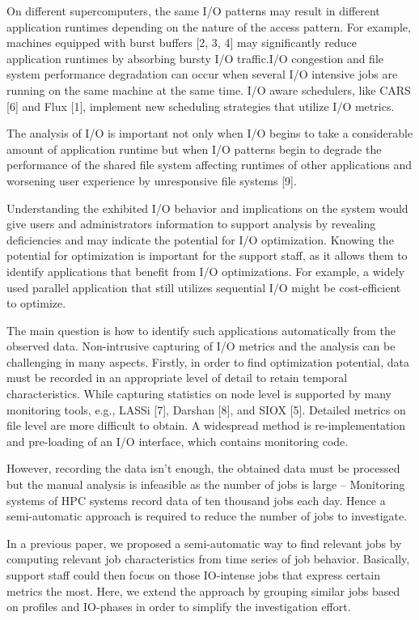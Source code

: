 \documentclass[]{llncs}
\begin{document}
On different supercomputers, the same I/O patterns may result in different application runtimes depending on the nature of the access pattern.
For example, machines equipped with burst buffers [2, 3, 4] may significantly reduce application runtimes by absorbing bursty I/O traffic.I/O congestion and file system performance degradation can occur when several I/O intensive jobs are running on the same machine at the same time.
I/O aware schedulers, like CARS [6] and Flux [1], implement new scheduling strategies that utilize I/O metrics.

The analysis of I/O is important not only when I/O begins to take a considerable amount of application runtime but when I/O patterns begin to degrade the performance of the shared file system affecting runtimes of other applications and worsening user experience by unresponsive file systems [9].

Understanding the exhibited I/O behavior and implications on the system would give users and administrators information to support analysis by revealing deficiencies and may indicate the potential for I/O optimization.
Knowing the potential for optimization is important for the support staff, as it allows them to identify applications that benefit from I/O optimizations.
For example, a widely used parallel application that still utilizes sequential I/O might be cost-efficient to optimize.

The main question is how to identify such applications automatically from the observed data.
Non-intrusive capturing of I/O metrics and the analysis can be challenging in many aspects.
Firstly, in order to find optimization potential, data must be recorded in an appropriate level of detail to retain temporal characteristics.
While capturing statistics on node level is supported by many monitoring tools, e.g., LASSi [7], Darshan [8], and SIOX [5].
Detailed metrics on file level are more difficult to obtain.
A widespread method is re-implementation and pre-loading of an I/O interface, which contains monitoring code.

However, recording the data isn’t enough, the obtained data must be processed but the manual analysis is infeasible as the number of jobs is large -- Monitoring systems of HPC systems record data of ten thousand jobs each day.
Hence a semi-automatic approach is required to reduce the number of jobs to investigate.

In a previous paper, we proposed a semi-automatic way to find relevant jobs by computing relevant job characteristics from time series of job behavior.
Basically, support staff could then focus on those IO-intense jobs that express certain metrics the most.
Here, we extend the approach by grouping similar jobs based on profiles and IO-phases in order to simplify the investigation effort.
\end{document}
